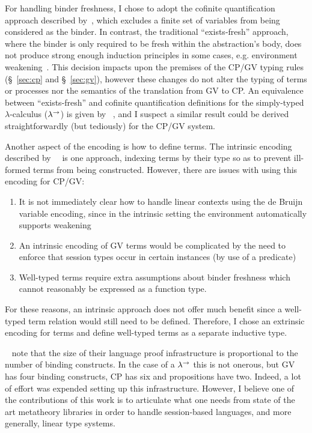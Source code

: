 For handling binder freshness, I chose to adopt the cofinite quantification
approach described by~\citeauthor{Aydemir:2008:EFM}, which excludes a finite
set of variables from being considered as the binder. In contrast, the
traditional ``exists-fresh'' approach, where the binder is only required to be
fresh within the abstraction's body, does not produce strong enough induction
principles in some cases, e.g. environment
weakening~\cite{Aydemir:2008:EFM}. This decision impacts upon the premises of
the CP/GV typing rules (\S~\ref{sec:cp} and \S~\ref{sec:gv}), however these
changes do not alter the typing of terms or processes nor the semantics of the
translation from GV to CP. An equivalence between ``exists-fresh'' and
cofinite quantification definitions for the simply-typed $\lambda$-calculus
($\lambda^\rightarrow$) is given by \citeauthor{Aydemir:2008:EFM}~\cite{Aydemir:2008:EFM},
and I suspect a similar result could be derived straightforwardly (but
tediously) for the CP/GV system.

Another aspect of the encoding is how to define terms. The intrinsic encoding
described by~\citeauthor{Benton:2012:STT}~\cite{Benton:2012:STT} is one
approach, indexing terms by their type so as to prevent ill-formed terms from
being constructed. However, there are issues with using this encoding for
CP/GV:
\begin{enumerate}
\item It is not immediately clear how to handle linear contexts using the de
  Bruijn variable encoding, since in the intrinsic setting the environment
  automatically supports weakening
\item An intrinsic encoding of GV terms would be complicated by the need to
  enforce that session types occur in certain instances (by use of a
  predicate)
\item Well-typed terms require extra assumptions about binder freshness which
  cannot reasonably be expressed as a function type.
\end{enumerate}

For these reasons, an intrinsic approach does not offer much benefit since a
well-typed term relation would still need to be defined. Therefore, I chose an
extrinsic encoding for terms and define well-typed terms as a separate
inductive type.

\citeauthor{Aydemir:2008:EFM}~\cite{Aydemir:2008:EFM} note that the size of
their language proof infrastructure is proportional to the number of binding
constructs. In the case of a $\lambda^\rightarrow$ this is not onerous, but GV has four
binding constructs, CP has six and propositions have two. Indeed, a lot of
effort was expended setting up this infrastructure. However, I believe one of
the contributions of this work is to articulate what one needs from state of
the art metatheory libraries in order to handle session-based languages, and
more generally, linear type systems.

